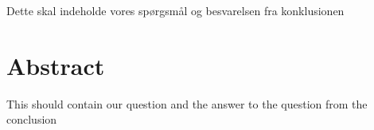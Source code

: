 Dette skal indeholde vores spørgsmål og besvarelsen fra konklusionen

\clearpage
\chapter*{Abstract}
This should contain our question and the answer to the question from the conclusion